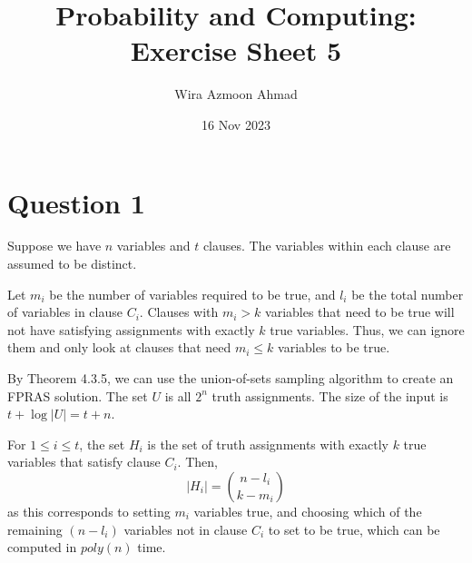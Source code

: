 \documentclass[11pt]{article} %
\title{Probability and Computing: \\Exercise Sheet 5}
\author{Wira Azmoon Ahmad}
\date{16 Nov 2023}
\begin{document}
%
\maketitle




\section*{Question 1}

Suppose we have $n$ variables and $t$ clauses. 
The variables within each clause are assumed to be distinct.

Let $m_i$ be the number of variables required to be true, 
and $l_i$ be the total number of variables in clause $C_i$.
Clauses with $m_i > k$ variables that need to be true 
will not have satisfying assignments with exactly $k$ true variables.
Thus, we can ignore them and only look at clauses that need $m_i \leq k$ variables to be true.

By Theorem 4.3.5, we can use the union-of-sets sampling algorithm to create an FPRAS solution.
The set $U$ is all $2^n$ truth assignments. 
The size of the input is $t + \log |U| = t + n$.

For $1 \leq i \leq t$, the set $H_i$ is the set of truth assignments 
with exactly $k$ true variables that satisfy clause $C_i$.
Then,
\[|H_i| = \binom{n-l_i}{k-m_i}\]
as this corresponds to setting $m_i$ variables true, 
and choosing which of the remaining $(n-l_i)$ variables not in clause $C_i$ to set to be true,
which can be computed in $poly(n)$ time.
\end{document}
